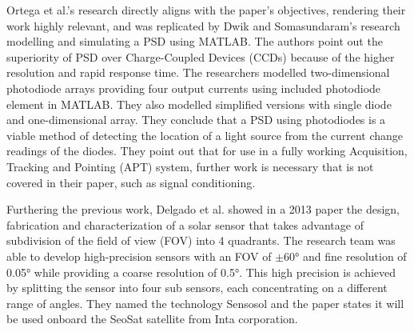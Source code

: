 Ortega et al.'s research directly aligns with the paper's objectives, rendering their work highly relevant, and was replicated by Dwik and Somasundaram's research modelling and simulating a PSD using MATLAB\cite{RefWorks:dwik*2019modeling}. 
The authors point out the superiority of PSD over Charge-Coupled Devices (CCDs) because of the higher resolution and rapid response time. 
The researchers modelled two-dimensional photodiode arrays providing four output currents using included photodiode element in MATLAB. 
They also modelled simplified versions with single diode and one-dimensional array. 
They conclude that a PSD using photodiodes is a viable method of detecting the location of a light source from the current change readings of the diodes. 
They point out that for use in a fully working Acquisition, Tracking and Pointing (APT) system, further work is necessary that is not covered in their paper, such as signal conditioning.

Furthering the previous work, Delgado et al. showed in a 2013 paper the design, fabrication and characterization of a solar sensor that takes advantage of subdivision of the field of view (FOV) into 4 quadrants. 
The research team was able to develop high-precision sensors with an FOV of $\pm$60° and fine resolution of 0.05° while providing a coarse resolution of 0.5°. 
This high precision is achieved by splitting the sensor into four sub sensors, each concentrating on a different range of angles. 
They named the technology Sensosol and the paper states it will be used onboard the SeoSat satellite from Inta corporation\cite{RefWorks:2013sensosol:}.